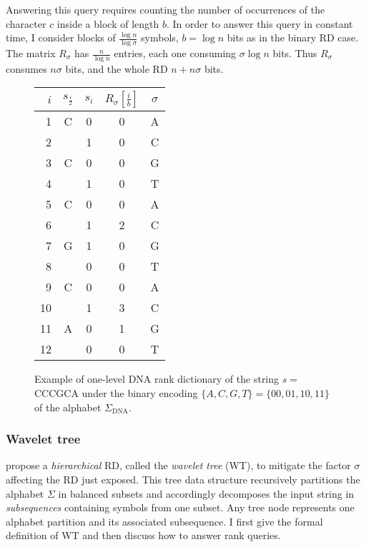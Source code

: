 Answering this query requires counting the number of occurrences of the character $c$ inside a block of length $b$.
In order to answer this query in constant time, I consider blocks of $\frac{\log{n}}{\log{\sigma}}$ symbols, \ie $b=\log{n}$ bits as in the binary RD case.
The matrix $R_{\sigma}$ has $\frac{n}{\log{n}}$ entries, each one consuming $\sigma \log{n}$ bits.
Thus $R_{\sigma}$ consumes $n \sigma$ bits, and the whole RD $n + n \sigma$ bits.

\begin{figure}[h]
\begin{center}
\caption[Example of one-level DNA rank dictionary]{Example of one-level DNA rank dictionary of the string $s=$ {\ttfamily CCCGCA} under the binary encoding $\{ A,C,G,T \} = \{ 00,01,10,11 \}$ of the alphabet $\Sigma_{\text{DNA}}$.}
\label{fig:rd_dna}
\ttfamily
\begin{tabular}{rcccc}
$i$	& $s_{\frac{i}{2}}$	& $s_i$ & $R_{\sigma}[\frac{i}{b}]$ & $\sigma$\\
\midrule
1   & C & 0 & 0 & A\\
2   &   & 1 & 0 & C\\
3   & C & 0 & 0 & G\\
4   &   & 1 & 0 & T\\
5   & C & 0 & 0 & A\\
6   &   & 1 & 2 & C\\
7   & G & 1 & 0 & G\\
8   &   & 0 & 0 & T\\
9   & C & 0 & 0 & A\\
10  &   & 1 & 3 & C\\
11  & A & 0 & 1 & G\\
12  &   & 0 & 0 & T\\
\end{tabular}
\end{center}
\end{figure}

\subsubsection{Wavelet tree}

\citeauthor{Grossi2003} propose a \emph{hierarchical} RD, called the \emph{wavelet tree} (WT), to mitigate the factor $\sigma$ affecting the RD just exposed.
This tree data structure recursively partitions the alphabet $\Sigma$ in balanced subsets and accordingly decomposes the input string in \emph{subsequences} containing symbols from one subset.
Any tree node represents one alphabet partition and its associated subsequence.
I first give the formal definition of WT and then discuss how to answer rank queries.

